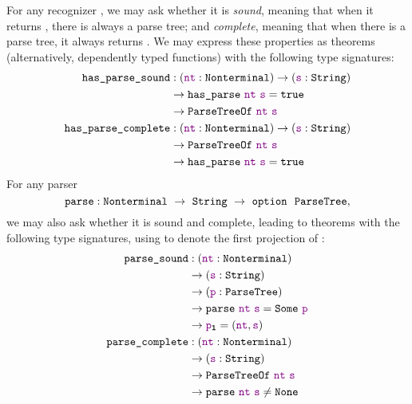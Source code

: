       For any recognizer , we may ask whether it is \emph{sound}, meaning that when it returns \true, there is always a parse tree; and \emph{complete}, meaning that when there is a parse tree, it always returns \true.  We may express these properties as theorems (alternatively, dependently typed functions) with the following type signatures:
      \begin{align*}
        \fname{has\_parse\_sound} & \oftypesep
        (\oftype{\farg{nt}}{\Nonterminal})
        \typeto (\oftype{\farg{s}}{\String}) \\
        & \typeto \fname{has\_parse}~\farg{nt}~\farg{s} = \true \\
        & \typeto \indname{ParseTreeOf}~\farg{nt}~\farg{s} \\
        \fname{has\_parse\_complete} & \oftypesep
        (\oftype{\farg{nt}}{\Nonterminal})
        \typeto (\oftype{\farg{s}}{\String}) \\
        & \typeto \indname{ParseTreeOf}~\farg{nt}~\farg{s} \\
        & \typeto \fname{has\_parse}~\farg{nt}~\farg{s} = \true
      \end{align*}
      For any parser
      $$\oftype{\fname{parse}}{\Nonterminal~\typeto~\String~\typeto~\typeoption{\indname{ParseTree}}},$$
      we may also ask whether it is sound and complete, leading to theorems with the following type signatures, using  to denote the first projection of :
      \begin{align*}
        \fname{parse\_sound} & \oftypesep
        (\oftype{\farg{nt}}{\Nonterminal}) \\
        & \typeto (\oftype{\farg{s}}{\String}) \\
        & \typeto (\oftype{\farg{p}}{\indname{ParseTree}}) \\
        & \typeto \fname{parse}~\farg{nt}~\farg{s} = \Some{\farg{p}} \\
        & \typeto \proj1{\farg{p}} = (\farg{nt}, \farg{s}) \\
        \fname{parse\_complete} & \oftypesep
        (\oftype{\farg{nt}}{\Nonterminal}) \\
        & \typeto (\oftype{\farg{s}}{\String}) \\
        & \typeto \indname{ParseTreeOf}~\farg{nt}~\farg{s} \\
        & \typeto \fname{parse}~\farg{nt}~\farg{s} \neq \None
      \end{align*}
